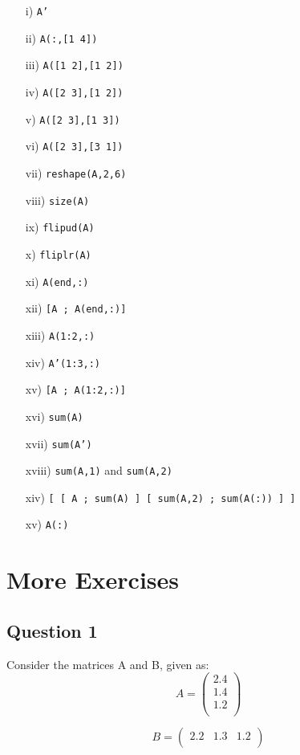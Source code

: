 \documentclass[a4paper,12pt]{article}
\begin{document}
\begin{itemize}
\item[i)] \texttt{A'}
\item[ii)] \texttt{A(:,[1 4])}
\item[iii)] \texttt{A([1 2],[1 2])}
\item[iv)] \texttt{A([2 3],[1 2])}
\item[v)] \texttt{A([2 3],[1 3])}
\item[vi)] \texttt{A([2 3],[3 1])}
\item[vii)] \texttt{reshape(A,2,6)}
\item[viii)] \texttt{size(A)}
\item[ix)] \texttt{flipud(A)}
\item[x)] \texttt{fliplr(A)}
\item[xi)] \texttt{A(end,:)}
\item[xii)]\texttt{[A ; A(end,:)]}
\item[xiii)] \texttt{A(1:2,:)}
\item[xiv)] \texttt{A'(1:3,:)}
\item[xv)]\texttt{[A ; A(1:2,:)]}
\item[xvi)] \texttt{sum(A)}  
\item[xvii)] \texttt{sum(A')}
\item[xviii)] \texttt{sum(A,1)} and \texttt{sum(A,2)}
\item[xiv)] \texttt{[ [ A ; sum(A) ] [ sum(A,2) ; sum(A(:)) ] ]}
\item[xv)] \texttt{A(:)}
\end{itemize}




\section{More Exercises}
\subsection*{Question 1}
Consider the matrices A and B, given as:
\[A= \left(
\begin{array}{c}
2.4  \\
1.4  \\
1.2  \\
\end{array}
\right)\]

\[B= \left(
\begin{array}{ccc}
2.2  & 1.3 & 1.2  \\
\end{array}
\right)\]
\end{document}
